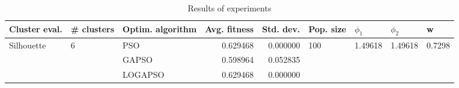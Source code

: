 \begin{table}
\centering
\caption{Results of experiments}
\begin{tabular}{lllrrllll}
\toprule
              Cluster eval. &        \# clusters & Optim. algorithm &  Avg. fitness &  Std. dev. &            Pop. size &               $\phi_{1}$ &               $\phi_{2}$ &                       w \\
\midrule
\multirow{3}{*}{Silhouette} & \multirow{3}{*}{6} &              PSO &      0.629468 &   0.000000 & \multirow{3}{*}{100} & \multirow{3}{*}{1.49618} & \multirow{3}{*}{1.49618} & \multirow{3}{*}{0.7298} \\
                            &                    &            GAPSO &      0.598964 &   0.052835 &                      &                          &                          &                         \\
                            &                    &          LOGAPSO &      0.629468 &   0.000000 &                      &                          &                          &                         \\
\bottomrule
\end{tabular}
\end{table}
